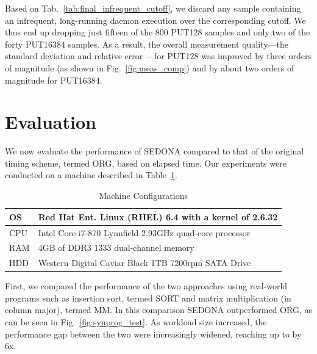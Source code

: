 \documentclass[letter]{ieice}
\begin{document}
Based on Tab.~\ref{tab:final_infrequent_cutoff}, 
we discard any \hbox{sample} \hbox{containing} an infrequent, long-running daemon execution
over the corresponding cutoff. We thus end up dropping just fifteen of the 800
PUT128 samples and only two of the forty PUT16384 samples. 
As a result, the \hbox{overall} \hbox{measurement} quality---the standard deviation and \hbox{relative} error 
---for PUT128 was improved 
by three orders of magnitude (as shown in Fig.~\ref{fig:meas_comp}) 
and by about two \hbox{orders} of magnitude for PUT16384.

\section{Evaluation}
\label{sec:eval}
\vspace{-0.07in}
We now evaluate the \hbox{performance} of SEDONA 
compared to that of the original timing scheme, termed ORG, based on 
elapsed time.
Our experiments were conducted on a \hbox{machine}
described in Table~\ref{tab:machine_config}. 
\begin{table}[h]
\vspace{-0.2in}
\begin{center}
{\tiny
\begin{tabular}{|l|p{7cm}|}\hline
OS & Red Hat Ent. Linux (RHEL) 6.4 with a kernel of 2.6.32 \\ \hline
CPU & Intel Core i7-870 Lynnfield 2.93GHz quad-core \hbox{processor}\\ \hline
RAM & 4GB of DDR3 1333 dual-channel memory\\ \hline
HDD & Western Digital Caviar Black 1TB 7200rpm SATA Drive\\ \hline
\end{tabular}
}
\end{center}
\caption{Machine Configurations\label{tab:machine_config}}
\vspace{-0.35in}
\end{table}

{\color{blue}
First, we compared the performance of the two approaches 
using real-world programs such as insertion sort, termed SORT and 
matrix multiplication (in column major), termed MM. 
In this comparison SEDONA outperformed ORG, as can be seen in Fig.~\ref{fig:synprog_test}. 
As workload size increased, the performance gap between the two 
were increasingly widened, reaching up to by 6x.
}
\end{document}
